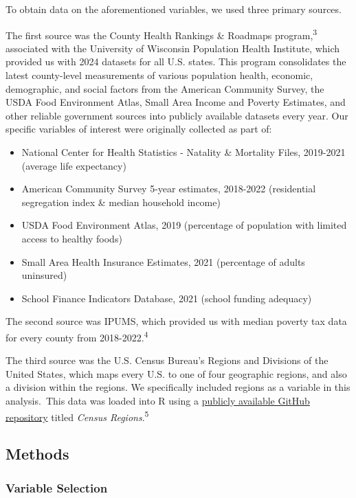 \documentclass[
  10pt,
  letterpaper,
  DIV=11,
  numbers=noendperiod]{scrartcl}
\begin{document}
To obtain data on the aforementioned variables, we used three primary
sources.~

The first source was the County Health Rankings \& Roadmaps
program,\textsuperscript{3} associated with the University of Wisconsin
Population Health Institute, which provided us with 2024 datasets for
all U.S. states. This program consolidates the latest county-level
measurements of various population health, economic, demographic, and
social factors from the American Community Survey, the USDA Food
Environment Atlas, Small Area Income and Poverty Estimates, and other
reliable government sources into publicly available datasets every year.
Our specific variables of interest were originally collected as part of:

\begin{itemize}
\item
  National Center for Health Statistics - Natality \& Mortality Files,
  2019-2021 (average life expectancy)
\item
  American Community Survey 5-year estimates, 2018-2022 (residential
  segregation index \& median household income)
\item
  USDA Food Environment Atlas, 2019 (percentage of population with
  limited access to healthy foods)
\item
  Small Area Health Insurance Estimates, 2021 (percentage of adults
  uninsured)
\item
  School Finance Indicators Database, 2021 (school funding adequacy)
\end{itemize}

The second source was IPUMS, which provided us with median poverty tax
data for every county from 2018-2022.\textsuperscript{4}

The third source was the U.S. Census Bureau's Regions and Divisions of
the United States, which maps every U.S. to one of four geographic
regions, and also a division within the regions. We specifically
included regions as a variable in this analysis.~This data was loaded
into R using a
\href{https://github.com/cphalpert/census-regions}{publicly available
GitHub repository} titled \emph{Census Regions}.\textsuperscript{5}

\subsection{\texorpdfstring{\textbf{Methods}}{Methods}}\label{methods}

\subsubsection{Variable Selection}\label{variable-selection}
\end{document}

